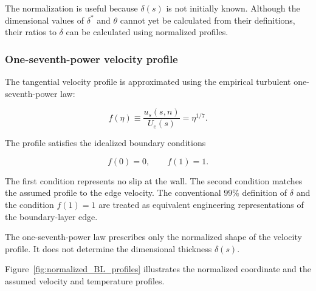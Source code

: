 The normalization is useful because \(\delta(s)\) is not initially known.
Although the dimensional values of \(\delta^*\) and \(\theta\) cannot yet be
calculated from their definitions, their ratios to \(\delta\) can be
calculated using normalized profiles.

\subsubsection{One-seventh-power velocity profile}

The tangential velocity profile is approximated using the empirical turbulent
one-seventh-power law:

\begin{equation}
    \boxed{
    f(\eta)
    \equiv
    \frac{u_s(s,n)}{U_e(s)}
    =
    \eta^{1/7}
    }.
    \label{eq:one_seventh_velocity_profile}
\end{equation}

The profile satisfies the idealized boundary conditions

\begin{equation}
    f(0)=0,
    \qquad
    f(1)=1.
\end{equation}

The first condition represents no slip at the wall. The second condition
matches the assumed profile to the edge velocity. The conventional
\(99\%\) definition of \(\delta\) and the condition \(f(1)=1\) are treated as
equivalent engineering representations of the boundary-layer edge.

The one-seventh-power law prescribes only the normalized shape of the velocity
profile. It does not determine the dimensional thickness \(\delta(s)\).

Figure~\ref{fig:normalized_BL_profiles} illustrates the normalized coordinate
and the assumed velocity and temperature profiles.

